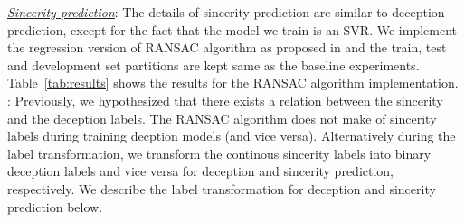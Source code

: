 \documentclass{article}
\begin{document}
\noindent\underline{\it Sincerity prediction}: 
The details of sincerity prediction are similar to deception prediction, except for the fact that the model we train is an SVR.
We implement the regression version of RANSAC algorithm as proposed in \cite{} and the train, test and development set partitions are kept same as the baseline experiments.
Table~\ref{tab:results} shows the results for the RANSAC algorithm implementation.
\\

:
Previously, we hypothesized that there exists a relation between the sincerity and the deception labels.
The RANSAC algorithm does not make of sincerity labels during training decption models (and vice versa). 
Alternatively during the label transformation, we transform the continous sincerity labels into binary deception labels and vice versa for deception and sincerity prediction, respectively.
We describe the label transformation for deception and sincerity prediction below.
\\
\end{document}
